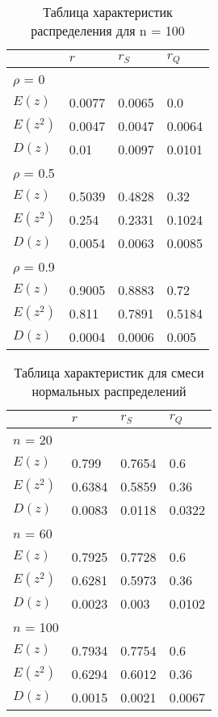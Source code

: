 \begin{table}[H]
\centering
    \begin{tabular}{|l||l|l|l|}
    \hline
         &  $r$ &   $r_S$   &   $r_Q$ \\ \hline \hline
         $\rho$ = 0& & &  \\ \hline
         $E(z)$ & 0.0077 & 0.0065 & 0.0\\ \hline
         $E(z^2)$&  0.0047 & 0.0047 & 0.0064   \\ \hline
         $D(z)$& 0.01 & 0.0097 & 0.0101    \\ \hline
       \hline
         $\rho$ = 0.5& & &  \\ \hline
         $E(z)$ & 0.5039 & 0.4828 & 0.32      \\ \hline
         $E(z^2)$ & 0.254 & 0.2331 & 0.1024     \\ \hline
          $D(z)$& 0.0054 & 0.0063 & 0.0085 \\ \hline
        \hline
        $\rho$ = 0.9& & &  \\ \hline
        $E(z)$ & 0.9005 & 0.8883 & 0.72       \\ \hline
         $E(z^2)$&0.811 & 0.7891 & 0.5184      \\ \hline
          $D(z)$ & 0.0004 & 0.0006 & 0.005\\ \hline
    \end{tabular}
     \caption{Таблица характеристик распределения для n = 100}
    \label{tab:my_label}
\end{table}
\begin{table}[H]
\centering
    \begin{tabular}{|l||l|l|l|}
    \hline
         &  $r$ &   $r_S$   &   $r_Q$ \\ \hline \hline
         $n$ = 20& & &  \\ \hline
         $E(z)$  & 0.799 & 0.7654 & 0.6 \\ \hline
         $E(z^2)$&0.6384 & 0.5859 & 0.36     \\ \hline
         $D(z)$&  0.0083 & 0.0118 & 0.0322   \\ \hline
       \hline
         $n$ = 60& & &  \\ \hline
         $E(z)$ &  0.7925 & 0.7728 & 0.6      \\ \hline
         $E(z^2)$ & 0.6281 & 0.5973 & 0.36      \\ \hline
          $D(z)$& 0.0023 & 0.003 & 0.0102 \\ \hline
        \hline
        $n$ = 100& & &  \\ \hline
        $E(z)$ & 0.7934 & 0.7754 & 0.6         \\ \hline
         $E(z^2)$& 0.6294 & 0.6012 & 0.36    \\ \hline
          $D(z)$ & 0.0015 & 0.0021 & 0.0067 \\ \hline
    \end{tabular}
     \caption{Таблица характеристик для смеси нормальных распределений}
    \label{tab:my_label}
\end{table}
